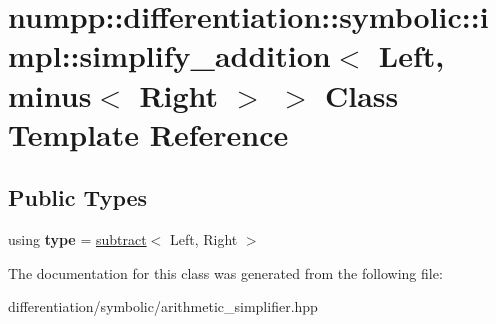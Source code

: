 \hypertarget{classnumpp_1_1differentiation_1_1symbolic_1_1impl_1_1simplify__addition_3_01Left_00_01minus_3_01Right_01_4_01_4}{}\section{numpp\+:\+:differentiation\+:\+:symbolic\+:\+:impl\+:\+:simplify\+\_\+addition$<$ Left, minus$<$ Right $>$ $>$ Class Template Reference}
\label{classnumpp_1_1differentiation_1_1symbolic_1_1impl_1_1simplify__addition_3_01Left_00_01minus_3_01Right_01_4_01_4}
\subsection*{Public Types}
\begin{DoxyCompactItemize}
\item 
\mbox{\label{classnumpp_1_1differentiation_1_1symbolic_1_1impl_1_1simplify__addition_3_01Left_00_01minus_3_01Right_01_4_01_4_a3bcf43be3c4ec83f4bfb359f2f8c6978}} 
using {\bfseries type} = \hyperlink{classnumpp_1_1differentiation_1_1symbolic_1_1subtract}{subtract}$<$ Left, Right $>$
\end{DoxyCompactItemize}


The documentation for this class was generated from the following file\+:\begin{DoxyCompactItemize}
\item 
differentiation/symbolic/arithmetic\+\_\+simplifier.\+hpp\end{DoxyCompactItemize}
